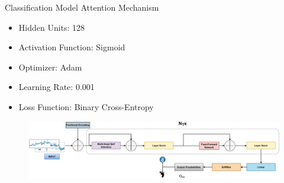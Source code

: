 \begin{frame}{Classification Model \textemdash{} Attention Mechanism}
    \begin{minipage}[c]{.6\textwidth}
        \begin{itemize}
            \item Hidden Units: 128
            \item Activation Function: Sigmoid
            \item Optimizer: Adam
            \item Learning Rate: 0.001
            \item Loss Function: Binary Cross-Entropy
        \end{itemize}
    \end{minipage}
    \begin{minipage}[c]{.39\textwidth}
        \begin{figure}[!htbp]
            \centering
            \includegraphics[width=\textwidth]{figures/Methodology/Attention}
        \end{figure}
    \end{minipage}
\end{frame}

